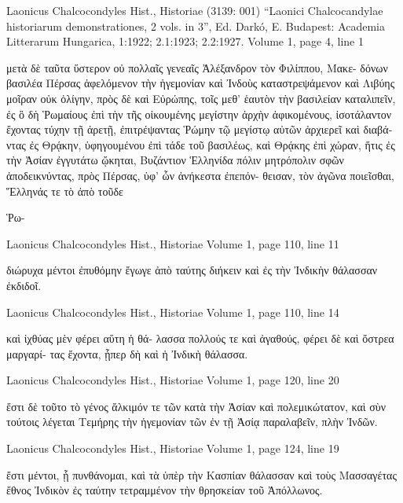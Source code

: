 \documentclass[12pt,letterpaper,twoside,final]{memoir}
\begin{document}
\begin{greek}

Laonicus Chalcocondyles Hist., Historiae (3139: 001)
“Laonici Chalcocandylae historiarum demonstrationes, 2 vols. in 3”, Ed. Darkó, E.
Budapest: Academia Litterarum Hungarica, 1:1922; 2.1:1923; 2.2:1927.
Volume 1, page 4, line 1

                                                       μετὰ δὲ ταῦτα 
ὕστερον οὐ πολλαῖς γενεαῖς Ἀλέξανδρον τὸν Φιλίππου, Μακε-  
δόνων βασιλέα Πέρσας ἀφελόμενον τὴν ἡγεμονίαν καὶ Ἰνδοὺς 
καταστρεψάμενον καὶ Λιβύης μοῖραν οὐκ ὀλίγην, πρὸς δὲ καὶ 
Εὐρώπης, τοῖς μεθ' ἑαυτὸν τὴν βασιλείαν καταλιπεῖν, ἐς ὃ δὴ 
Ῥωμαίους ἐπὶ τὴν τῆς οἰκουμένης μεγίστην ἀρχὴν ἀφικομένους, 
ἰσοτάλαντον ἔχοντας τύχην τῇ ἀρετῇ, ἐπιτρέψαντας Ῥώμην τῷ 
μεγίστῳ αὐτῶν ἀρχιερεῖ καὶ διαβάντας ἐς Θρᾴκην, ὑφηγουμένου 
ἐπὶ τάδε τοῦ βασιλέως, καὶ Θρᾴκης ἐπὶ χώραν, ἥτις ἐς τὴν 
Ἀσίαν ἐγγυτάτω ᾤκηται, Βυζάντιον Ἑλληνίδα πόλιν μητρόπολιν 
σφῶν ἀποδεικνύντας, πρὸς Πέρσας, ὑφ' ὧν ἀνήκεστα ἐπεπόν-
θεισαν, τὸν ἀγῶνα ποιεῖσθαι, Ἕλληνάς τε τὸ ἀπὸ τοῦδε

Ῥω-



Laonicus Chalcocondyles Hist., Historiae 
Volume 1, page 110, line 11

διώρυχα μέντοι ἐπυθόμην ἔγωγε ἀπὸ ταύτης διήκειν καὶ ἐς τὴν 
Ἰνδικὴν θάλασσαν ἐκδιδοῖ. 



Laonicus Chalcocondyles Hist., Historiae 
Volume 1, page 110, line 14

                                καὶ ἰχθύας μὲν φέρει αὕτη ἡ θά-
λασσα πολλούς τε καὶ ἀγαθούς, φέρει δὲ καὶ ὄστρεα μαργαρί-
τας ἔχοντα, ᾗπερ δὴ καὶ ἡ Ἰνδικὴ θάλασσα. 



Laonicus Chalcocondyles Hist., Historiae 
Volume 1, page 120, line 20

               ἔστι δὲ τοῦτο τὸ γένος ἄλκιμόν τε τῶν κατὰ τὴν 
Ἀσίαν καὶ πολεμικώτατον, καὶ σὺν τούτοις λέγεται Τεμήρης 
τὴν ἡγεμονίαν τῶν ἐν τῇ Ἀσίᾳ παραλαβεῖν, πλὴν Ἰνδῶν. 



Laonicus Chalcocondyles Hist., Historiae 
Volume 1, page 124, line 19

                                                                   ἔστι 
μέντοι, ᾗ πυνθάνομαι, καὶ τὰ ὑπὲρ τὴν Κασπίαν θάλασσαν καὶ 
τοὺς Μασσαγέτας ἔθνος Ἰνδικὸν ἐς ταύτην τετραμμένον τὴν 
θρησκείαν τοῦ Ἀπόλλωνος. 




\end{greek}
\end{document}
